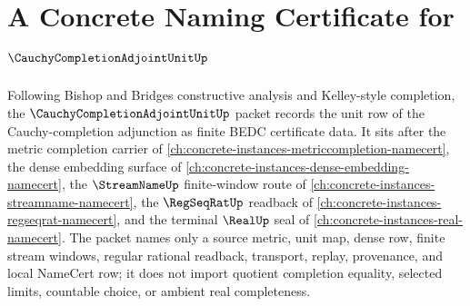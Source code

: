 \chapter{A Concrete Naming Certificate for $\CauchyCompletionAdjointUnitUp$}
\label{ch:concrete-instances-cauchy-completion-adjoint-unit-namecert}

Following Bishop and Bridges constructive analysis and Kelley-style completion, the $\CauchyCompletionAdjointUnitUp$ packet records the unit row of the Cauchy-completion adjunction as finite BEDC certificate data. It sits after the metric completion carrier of \autoref{ch:concrete-instances-metriccompletion-namecert}, the dense embedding surface of \autoref{ch:concrete-instances-dense-embedding-namecert}, the $\StreamNameUp$ finite-window route of \autoref{ch:concrete-instances-streamname-namecert}, the $\RegSeqRatUp$ readback of \autoref{ch:concrete-instances-regseqrat-namecert}, and the terminal $\RealUp$ seal of \autoref{ch:concrete-instances-real-namecert}. The packet names only a source metric, unit map, dense row, finite stream windows, regular rational readback, transport, replay, provenance, and local NameCert row; it does not import quotient completion equality, selected limits, countable choice, or ambient real completeness.

